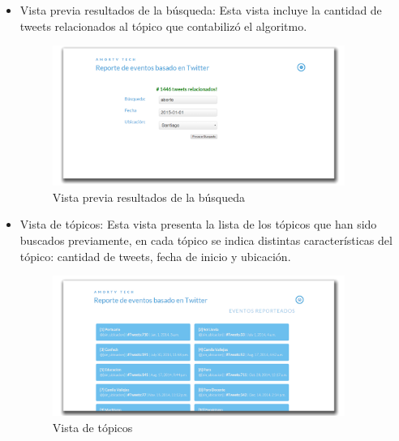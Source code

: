 \begin{itemize}
	\item {Vista previa resultados de la búsqueda}: Esta vista incluye la cantidad de tweets relacionados al tópico que contabilizó el algoritmo.
	\begin{figure}[H]
		\centering
		\includegraphics[width=0.9\textwidth]{imgs/vistas_newsearch_results.PNG}
		\caption{Vista previa resultados de la búsqueda}
		\label{fig:vista_newsearch_resultados}
	\end{figure}
	\newpage
		\item {Vista de tópicos}: Esta vista presenta la lista de los tópicos que han sido buscados previamente, en cada tópico se indica distintas características del tópico: cantidad de tweets, fecha de inicio y ubicación.
		\begin{figure}[H]
			\centering
			\includegraphics[width=0.9\textwidth]{imgs/vistas_topicos.PNG}
			\caption{Vista de tópicos}
			\label{fig:vista_topicos}
		\end{figure}
	

\end{itemize}
